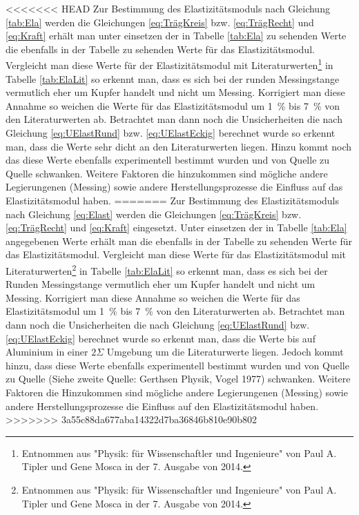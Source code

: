 <<<<<<< HEAD
Zur Bestimmung des Elastizitätsmoduls nach Gleichung \ref{tab:Ela} werden die Gleichungen \ref{eq:TrägKreis} bzw. \ref{eq:TrägRecht} und \ref{eq:Kraft} erhält man unter einsetzen der in Tabelle \ref{tab:Ela} zu sehenden Werte die ebenfalls in der Tabelle zu sehenden Werte für das Elastizitätsmodul.
Vergleicht man diese Werte für der Elastizitätsmodul mit Literaturwerten\footnote{Entnommen aus "Physik: für Wissenschaftler und Ingenieure" von Paul A. Tipler und Gene Mosca in der 7. Ausgabe von 2014.} in Tabelle \ref{tab:ElaLit} so erkennt man, dass es sich bei der runden Messingstange vermutlich eher um Kupfer handelt und nicht um Messing. Korrigiert man diese Annahme so weichen die Werte für das Elastizitätsmodul um \SI{1}{\percent} bis \SI{7}{\percent} von den Literaturwerten ab. Betrachtet man dann noch die Unsicherheiten die nach Gleichung \ref{eq:UElastRund} bzw. \ref{eq:UElastEckig} berechnet wurde so erkennt man, dass die Werte sehr dicht an den Literaturwerten liegen. Hinzu kommt noch das diese Werte ebenfalls experimentell bestimmt wurden und von Quelle zu Quelle schwanken. Weitere Faktoren die hinzukommen sind mögliche andere Legierungenen (Messing) sowie andere Herstellungsprozesse die Einfluss auf das Elastizitätsmodul haben. 
=======
Zur Bestimmung des Elastizitätsmoduls nach Gleichung \ref{eq:Elast} werden die Gleichungen \ref{eq:TrägKreis} bzw. \ref{eq:TrägRecht} und \ref{eq:Kraft} eingesetzt. Unter einsetzen der in Tabelle \ref{tab:Ela} angegebenen Werte erhält man die ebenfalls in der Tabelle zu sehenden Werte für das Elastizitätsmodul.
Vergleicht man diese Werte für das Elastizitätsmodul mit Literaturwerten\footnote{Entnommen aus "Physik: für Wissenschaftler und Ingenieure" von Paul A. Tipler und Gene Mosca in der 7. Ausgabe von 2014.} in Tabelle \ref{tab:ElaLit} so erkennt man, dass es sich bei der Runden Messingstange vermutlich eher um Kupfer handelt und nicht um Messing. Korrigiert man diese Annahme so weichen die Werte für das Elastizitätsmodul um \SI{1}{\percent} bis \SI{7}{\percent} von den Literaturwerten ab. Betrachtet man dann noch die Unsicherheiten die nach Gleichung \ref{eq:UElastRund} bzw. \ref{eq:UElastEckig} berechnet wurde so erkennt man, dass die Werte bis auf Aluminium in einer $2\Sigma$ Umgebung um die Literaturwerte liegen. Jedoch kommt hinzu, dass diese Werte ebenfalls experimentell bestimmt wurden und von Quelle zu Quelle (Siehe zweite Quelle: Gerthsen Physik, Vogel 1977) schwanken. Weitere Faktoren die Hinzukommen sind mögliche andere Legierungenen (Messing) sowie andere Herstellungsprozesse die Einfluss auf den Elastizitätsmodul haben. 
>>>>>>> 3a55c88da677aba14322d7ba36846b810e90b802


